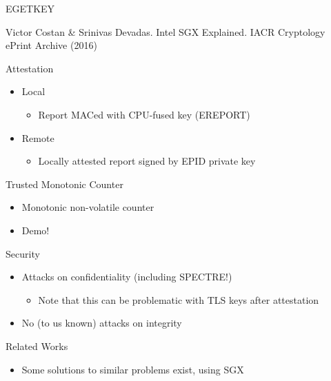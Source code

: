 \documentclass{beamer}
\begin{document}
	\begin{frame}{EGETKEY}
		

		\center\fontsize{4pt}{1}\selectfont
		Victor Costan \& Srinivas Devadas. Intel SGX Explained. IACR Cryptology ePrint Archive (2016)
	\end{frame}

	\begin{frame}{Attestation} %
		\begin{itemize}
			\item Local
				\begin{itemize}
					\item Report MACed with CPU-fused key (EREPORT)
				\end{itemize}
			\item Remote
				\begin{itemize}
					\item Locally attested report signed by EPID private key
				\end{itemize}
		\end{itemize}
	\end{frame}

	\begin{frame}{Trusted Monotonic Counter} %
		\begin{itemize}
			\item Monotonic non-volatile counter
			\item Demo!
		\end{itemize}
	\end{frame}

	\begin{frame}{Security}	%
		\begin{itemize}
			\item Attacks on confidentiality (including SPECTRE!)
			\begin{itemize}
				\item Note that this can be problematic with TLS keys after attestation
			\end{itemize}
			\item No (to us known) attacks on integrity
		\end{itemize}
	\end{frame}

	\begin{frame}{Related Works} %
		\begin{itemize}
			\item Some solutions to similar problems exist, using SGX
		\end{itemize}
	\end{frame}
\end{document}
